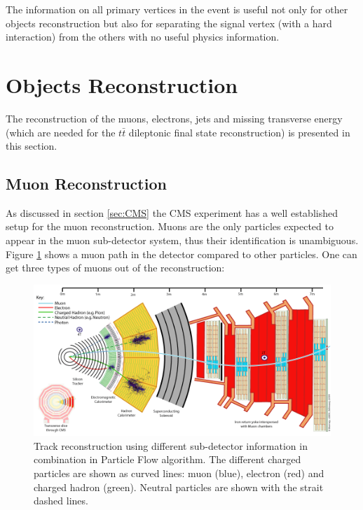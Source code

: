 The information on all primary vertices in the event is useful not only for other objects reconstruction but also for separating the signal vertex (with a hard interaction) 
from the others with no useful physics information.

\section{Objects Reconstruction}

The reconstruction of the muons, electrons, jets and missing transverse energy (which are needed for the $t\bar{t}$ dileptonic final
state reconstruction) is presented in this section.

\subsection{Muon Reconstruction}

As discussed in section \ref{sec:CMS} the CMS experiment has a well established setup for the muon reconstruction.
Muons are the only particles expected to appear in the muon sub-detector system, thus their identification is unambiguous.
Figure \ref{fig:PFmuons} shows a muon path in the detector compared to other particles.
One can get three types of muons out of the reconstruction:

\begin{figure}[t]
  \centering
  \includegraphics[width=1.0\textwidth]{04_event_reconstruction/plots/CMS_Slice.png}
  \caption{Track reconstruction using different sub-detector information in combination in Particle Flow algorithm. The different
  charged particles are shown as curved lines: muon (blue), electron (red) and charged hadron (green). Neutral particles are shown
  with the strait dashed lines.}
  \label{fig:PFmuons}
\end{figure}


